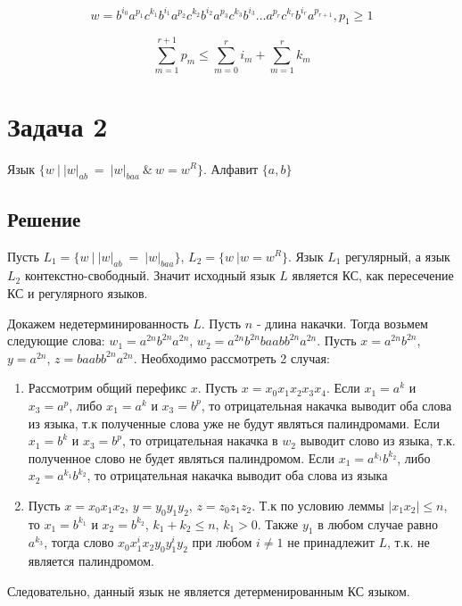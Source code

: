 \documentclass[a4paper, 14pt]{article}
\begin{document}
$$w = b^{i_0}a^{p_1}c^{k_1}b^{i_1}a^{p_2}c^{k_2}b^{i_2}a^{p_3}c^{k_3}b^{i_3}\ldots a^{p_r}c^{k_r}b^{i_r}a^{p_{r + 1}}, p_1 \geq 1 $$

\[ \sum_{m=1}^{r + 1}{p_m} \leq \sum_{m=0}^{r}{i_m} +  \sum_{m=1}^{r}{k_m}\]

\newpage 
\section{Задача 2}

Язык $\Big\{ w \ \Big| \ |w|_{ab} \ = \ |w|_{baa} \ \& \ w = w^{R} \Big\}$. Алфавит $\{a, b\}$


\subsection{Решение}

Пусть $L_1 = \{w \ \Big| \ |w|_{ab} \ = \ |w|_{baa} \}$, $L_2 = \{w \ \Big| w = w^{R}\}$. Язык $L_1$ регулярный, а язык $L_2$ контекстно-свободный. Значит исходный язык $L$ является КС, как пересечение КС и регулярного языков.

Докажем недетерминированность $L$. Пусть $n$ - длина накачки. Тогда возьмем следующие слова: $w_1 = a^{2n}b^{2n}a^{2n}$, $w_2 = a^{2n}b^{2n}baabb^{2n}a^{2n}$. Пусть $x = a^{2n}b^{2n}$, $y = a^{2n}$, $z = baabb^{2n}a^{2n}$. Необходимо рассмотреть 2 случая:

\begin{enumerate}
  \item{Рассмотрим общий перефикс $x$. Пусть $x = x_0 x_1 x_2 x_3 x_4$. Если $x_1 = a^k$ и $x_3 = a^p$, либо $x_1 = a^k$ и $x_3 = b^p$, то отрицательная накачка выводит оба слова из языка, т.к полученные слова уже не будут являться палиндромами. Если $x_1 = b^k$ и $x_3 = b^p$}, то отрицательная накачка в $w_2$ выводит слово из языка, т.к. полученное слово не будет являться палиндромом. Если $x_1 = a^{k_1} b^{k_2}$, либо $x_2 = a^{k_1} b^{k_2}$, то отрицательная накачка выводит оба слова из языка
  \item{Пусть $x = x_0 x_1 x_2$, $y = y_0 y_1 y_2$, $z = z_0 z_1 z_2$}. Т.к по условию леммы $|x_1 x_2| \leq n$, то $x_1 = b^{k_1}$ и $x_2 = b^{k_2}$, $k_1 + k_2 \leq n$, $k_1 > 0$. Также $y_1$ в любом случае равно $a^{k_3}$, тогда слово $x_0 x_1^{i} x_2 y_0 y_1^{i} y_2$ при любом $i \neq 1$ не принадлежит $L$, т.к. не является палиндромом.
\end{enumerate}

Следовательно, данный язык не является детерменированным КС языком.
\end{document}
